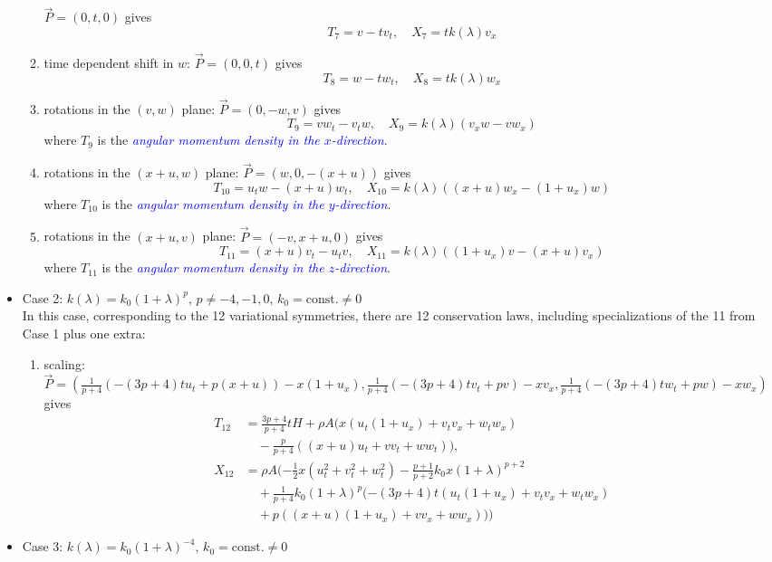 \documentclass[landscape]{slides}
\def\myemph#1{\textcolor{blue}{\em #1}}
\def\const{\text{const.}}
\begin{document}
\begin{itemize}
\begin{enumerate}[label=\roman*.]
$\vec{P} =(0,t,0)$ 
gives 
\[
T_7 = v - t v_t,
\quad
X_7 = t k(\lambda) v_x
\]
\item 
time dependent shift in $w$: 
$\vec{P} =(0,0,t)$ 
gives 
\[
T_8 = w - t w_t,
\quad
X_8 = t k(\lambda) w_x
\]
\item 
rotations in the $(v,w)$ plane: $\vec{P} =(0,-w,v)$ gives 
\[
T_9 = v w_t - v_t w,
\quad
X_9 = k(\lambda) (v_x w - v w_x)
\]
where $T_9$ is the \myemph{angular momentum density in the $x$-direction}.
\item 
rotations in the $(x+u,w)$ plane: $\vec{P} =(w,0,-(x+u))$ gives 
\[
T_{10} = u_t w - (x+u) w_t,  
\quad
X_{10} = k(\lambda) ((x + u) w_x - (1 + u_x) w)
\]
where $T_{10}$ is the \myemph{angular momentum density in the $y$-direction}.
\item 
rotations in the $(x+u,v)$ plane: $\vec{P} =(-v,x+u,0)$ gives 
\[
T_{11} = (x+u) v_t - u_t v,
\quad
X_{11} = k(\lambda) ((1 + u_x) v - (x + u) v_x )
\]
where $T_{11}$ is the \myemph{angular momentum density in the $z$-direction}.
\end{enumerate}

\newpage
\item
Case 2: 
$k(\lambda) = k_0 (1+\lambda)^{p}$,
\quad
$p \neq -4, -1, 0$, 
\quad
$k_0 = \const \neq 0$
\\
In this case, corresponding to the 12 variational symmetries, there are 12 conservation laws, including specializations of the 11 from Case 1 plus one extra:
\begin{enumerate}[label=\roman*.]
\item
scaling: $\vec{P} = 
(
\frac{1}{p+4} ( -(3p + 4) t u_t + p (x+u)) - x (1 + u_x),
\frac{1}{p+4} ( -(3p + 4) t v_t + p v) - x v_x, 
\frac{1}{p+4} ( -(3p + 4) t w_t + p w) - x w_x
)$ 
gives 
\[\begin{aligned}
T_{12} &=
\frac{3p +4}{p + 4} t H
+ 
\rho A
(
x 
(u_t (1 + u_x) + v_t v_x + w_t w_x) 
\\
& \quad
- \frac{p}{p + 4}  
((x + u) u_t + v v_t + w w_t)
), \\
X_{12} &=
\rho A 
(
- \frac{1}{2} x (u_t^2 + v_t^2 + w_t^2)
- \frac{p + 1}{p + 2} k_0 x (1 + \lambda)^{p + 2} \\
& \quad + \frac{1}{p+4} k_0 (1 + \lambda)^p 
(
- (3p + 4) t(u_t (1 + u_x) + v_t v_x + w_t w_x) \\
& \quad + p ( (x + u) (1 + u_x) + v v_x + w w_x ) 
)
)
\end{aligned}\]
\end{enumerate}

\newpage
\item
Case 3: 
$k(\lambda) = k_0 (1+\lambda)^{-4}$,
\quad
$k_0 = \const\neq 0$



\end{itemize}
\end{document}
